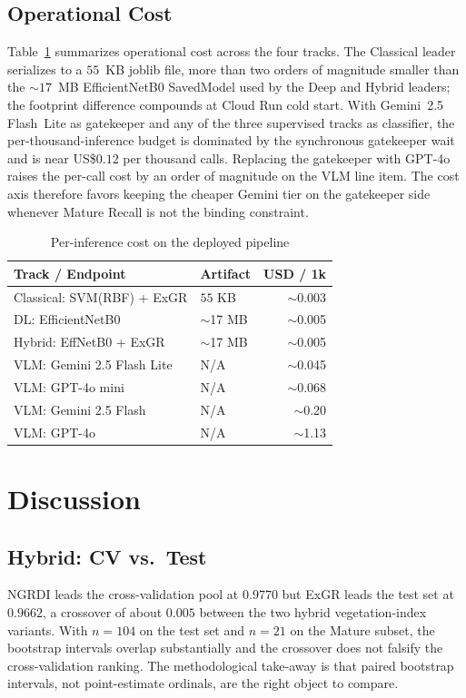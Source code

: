 \documentclass[conference]{IEEEtran}
\begin{document}
\subsection{Operational Cost}\label{sec:cost}
Table~\ref{tab:cost} summarizes operational cost across the four tracks. The Classical leader serializes to a $55$~KB joblib file, more than two orders of magnitude smaller than the $\sim$$17$~MB EfficientNetB0 SavedModel used by the Deep and Hybrid leaders; the footprint difference compounds at Cloud Run cold start. With Gemini~2.5 Flash~Lite as gatekeeper and any of the three supervised tracks as classifier, the per-thousand-inference budget is dominated by the synchronous gatekeeper wait and is near US\$$0.12$ per thousand calls. Replacing the gatekeeper with GPT-4o raises the per-call cost by an order of magnitude on the VLM line item. The cost axis therefore favors keeping the cheaper Gemini tier on the gatekeeper side whenever Mature Recall is not the binding constraint.

\begin{table}[t]
\caption{Per-inference cost on the deployed pipeline}
\label{tab:cost}
\centering
\footnotesize
\setlength{\tabcolsep}{3pt}
\begin{tabular}{@{}p{38mm}lr@{}}
\toprule
Track / Endpoint & Artifact & USD / 1k \\
\midrule
Classical: SVM(RBF) + ExGR     & $55$ KB      & $\sim$0.003 \\
DL: EfficientNetB0             & $\sim$17 MB  & $\sim$0.005 \\
Hybrid: EffNetB0 + ExGR        & $\sim$17 MB  & $\sim$0.005 \\
VLM: Gemini 2.5 Flash Lite     & N/A          & $\sim$0.045 \\
VLM: GPT-4o mini               & N/A          & $\sim$0.068 \\
VLM: Gemini 2.5 Flash          & N/A          & $\sim$0.20 \\
VLM: GPT-4o                    & N/A          & $\sim$1.13 \\
\bottomrule
\end{tabular}
\end{table}

\section{Discussion}
\subsection{Hybrid: CV vs.\ Test}
NGRDI leads the cross-validation pool at $0.9770$ but ExGR leads the test set at $0.9662$, a crossover of about $0.005$ between the two hybrid vegetation-index variants. With $n=104$ on the test set and $n=21$ on the Mature subset, the bootstrap intervals overlap substantially and the crossover does not falsify the cross-validation ranking. The methodological take-away is that paired bootstrap intervals, not point-estimate ordinals, are the right object to compare.
\end{document}
